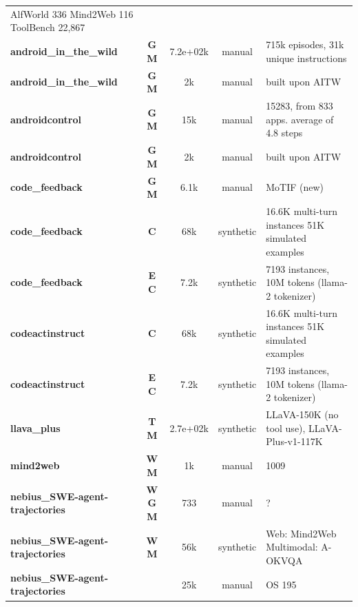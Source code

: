 \begin{table}[t]
\begin{tabular*}{\textwidth}{@{\extracolsep{\fill}}l c c c p{5cm}}
AlfWorld 336
Mind2Web 116
ToolBench 22,867 \\
        \textbf{android\_in\_the\_wild \cite{android_in_the_wild__2307_10088}} & \textbf{G} \textbf{M} & 7.2e+02k & manual & 715k episodes, 31k unique instructions \\
        \textbf{android\_in\_the\_wild \cite{android_in_the_zoo_c_2403_02713}} & \textbf{G} \textbf{M} & 2k & manual & built upon AITW \\
        \textbf{androidcontrol \cite{on_the_effects_of_da_2406_03679}} & \textbf{G} \textbf{M} & 15k & manual & 15283, from 833 apps. average of 4.8 steps \\
        \textbf{androidcontrol \cite{android_in_the_zoo_c_2403_02713}} & \textbf{G} \textbf{M} & 2k & manual & built upon AITW \\
        \textbf{code\_feedback \cite{mobile_app_tasks_wit_2104_08560}} & \textbf{G} \textbf{M} & 6.1k & manual & MoTIF (new) \\
        \textbf{code\_feedback \cite{opencodeinterpreter__2402_14658}} & \textbf{C} & 68k & synthetic & 16.6K multi-turn instances
51K simulated examples \\
        \textbf{code\_feedback \cite{executable_code_acti_2402_01030}} & \textbf{E} \textbf{C} & 7.2k & synthetic & 7193 instances, 10M tokens (llama-2 tokenizer) \\
        \textbf{codeactinstruct \cite{opencodeinterpreter__2402_14658}} & \textbf{C} & 68k & synthetic & 16.6K multi-turn instances
51K simulated examples \\
        \textbf{codeactinstruct \cite{executable_code_acti_2402_01030}} & \textbf{E} \textbf{C} & 7.2k & synthetic & 7193 instances, 10M tokens (llama-2 tokenizer) \\
        \textbf{llava\_plus \cite{llava_plus_learning__2311_05437}} & \textbf{T} \textbf{M} & 2.7e+02k & synthetic & LLaVA-150K (no tool use), LLaVA-Plus-v1-117K \\
        \textbf{mind2web \cite{mind2web_towards_a_g_2306_06070}} & \textbf{W} \textbf{M} & 1k & manual & 1009 \\
        \textbf{nebius\_SWE-agent-trajectories \cite{webvoyager_building__2401_13919}} & \textbf{W} \textbf{G} \textbf{M} & 733 & manual & ? \\
        \textbf{nebius\_SWE-agent-trajectories \cite{agent_lumos_unified__2311_05657}} & \textbf{W} \textbf{M} & 56k & synthetic & Web: Mind2Web
Multimodal: A-OKVQA \\
        \textbf{nebius\_SWE-agent-trajectories \cite{agent_flan_designing_2403_12881}} &  & 25k & manual & OS 195

\end{tabular*}
\end{table}
